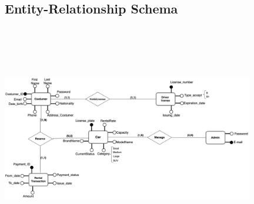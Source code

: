 \subsection{Entity-Relationship Schema}
\begin{center}

\includegraphics[width=11cm, height=10cm]{ERSchema.png}

\end{center}
